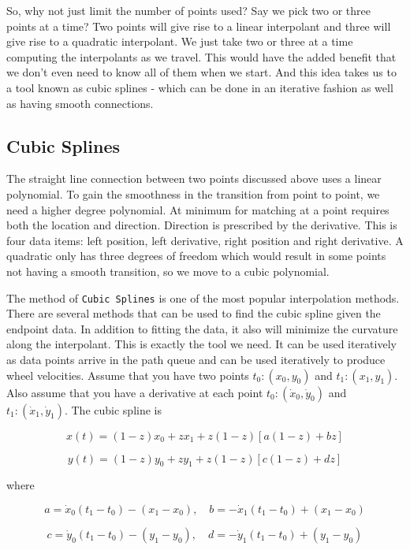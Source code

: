 So, why not just limit the number of points used? Say we pick two or
three points at a time? Two points will give rise to a linear
interpolant and three will give rise to a quadratic interpolant. We just
take two or three at a time computing the interpolants as we travel.
This would have the added benefit that we don't even need to know all of
them when we start. And this idea takes us to a tool known as cubic
splines - which can be done in an iterative fashion as well as having
smooth connections.

\hypertarget{text:cubicspline}{%
\subsection{Cubic Splines}\label{text:cubicspline}}

The straight line connection between two points discussed above uses a
linear polynomial. To gain the smoothness in the transition from point
to point, we need a higher degree polynomial. At minimum for matching at
a point requires both the location and direction. Direction is
prescribed by the derivative. This is four data items: left position,
left derivative, right position and right derivative. A quadratic only
has three degrees of freedom which would result in some points not
having a smooth transition, so we move to a cubic polynomial.

The method of \texttt{Cubic\ Splines} is one of the most popular
interpolation methods. There are several methods that can be used to
find the cubic spline given the endpoint data. In addition to fitting
the data, it also will minimize the curvature along the interpolant.
This is exactly the tool we need. It can be used iteratively as data
points arrive in the path queue and can be used iteratively to produce
wheel velocities. Assume that you have two points \(t_0: (x_0,y_0)\) and
\(t_1: (x_1, y_1)\). Also assume that you have a derivative at each
point \(t_0: (\dot{x}_0, \dot{y}_0)\) and
\(t_1: (\dot{x}_1, \dot{y}_1)\). The cubic spline is

\[x(t) = (1-z)x_0 + z x_1 + z(1-z)\left[ a(1-z) +b z\right]\]

\[y(t) = (1-z)y_0 + z y_1 + z(1-z)\left[ c(1-z) +d z\right]\]

where

\[a = \dot{x}_0(t_1-t_0)-(x_1-x_0), \quad b = -\dot{x}_1(t_1-t_0)+(x_1-x_0)\]

\[c = \dot{y}_0(t_1-t_0)-(y_1-y_0), \quad d = -\dot{y}_1(t_1-t_0)+(y_1-y_0)\]

